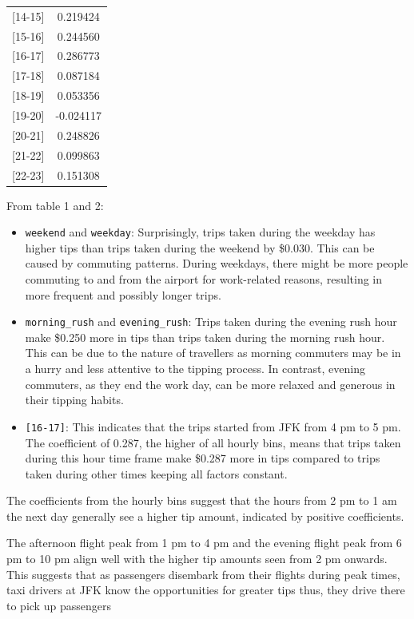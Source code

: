 \documentclass[11pt]{article}
\begin{document}
\begin{table}[h]
\begin{minipage}{.5\textwidth}
\begin{tabular}{lc}
            {[14-15]} & 0.219424 \\
            {[15-16]} & 0.244560 \\
            {[16-17]} & 0.286773 \\
            {[17-18]} & 0.087184 \\
            {[18-19]} & 0.053356 \\
            {[19-20]} & -0.024117 \\
            {[20-21]} & 0.248826 \\
            {[21-22]} & 0.099863 \\
            {[22-23]} & 0.151308 \\
            \bottomrule
        \end{tabular}
    \end{minipage}
\end{table}

From table 1 and 2:
\begin{itemize}
    \item \texttt{weekend} and \texttt{weekday}: Surprisingly, trips taken during the weekday has higher tips than trips taken during the weekend by \$0.030. This can be caused by commuting patterns. During weekdays, there might be more people commuting to and from the airport for work-related reasons, resulting in more frequent and possibly longer trips.
    \item \texttt{morning\_rush} and \texttt{evening\_rush}: Trips taken during the evening rush hour make \$0.250 more in tips than trips taken during the morning rush hour. This can be due to the nature of travellers as morning commuters may be in a hurry and less attentive to the tipping process. In contrast, evening commuters, as they end the work day, can be more relaxed and generous in their tipping habits.
    \item \texttt{[16-17]}: This indicates that the trips started from JFK from 4 pm to 5 pm. The coefficient of 0.287, the higher of all hourly bins, means that trips taken during this hour time frame make \$0.287 more in tips compared to trips taken during other times keeping all factors constant.
\end{itemize}

The coefficients from the hourly bins suggest that the hours from 2 pm to 1 am the next day generally see a higher tip amount, indicated by positive coefficients. 

The afternoon flight peak from 1 pm to 4 pm and the evening flight peak from 6 pm to 10 pm align well with the higher tip amounts seen from 2 pm onwards. This suggests that as passengers disembark from their flights during peak times, taxi drivers at JFK know the opportunities for greater tips thus, they drive there to pick up passengers
\end{document}
